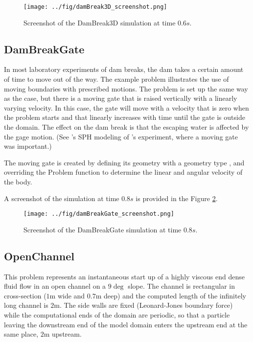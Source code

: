 \documentclass{../GPUSPHtemplate}
\begin{document}
\begin{figure}[h]
  \begin{center}
    \texttt{[image: ../fig/damBreak3D\_screenshot.png]}
    \caption{Screenshot of the DamBreak3D simulation at time $0.6s$.}\label{fig:DamBreak3D}   
  \end{center}
\end{figure}

\subsection{DamBreakGate}

In most laboratory experiments of dam breaks, the dam takes a certain
amount of time to move out of the way. The example problem
 illustrates the use of moving boundaries
with prescribed motions. The problem is set up the same way as the
 case, but there is a moving gate that is raised
vertically with a linearly varying velocity. In this case, the gate will
move with a velocity that is zero when the problem starts and that
linearly increases with time until the gate is outside the domain. The
effect on the dam break is that the escaping water is affected by the
gage motion. (See \cite{crespo_modeling_2008}'s SPH modeling of
\cite{janosi_turbulent_2004}'s experiment, where a moving gate was important.)

The moving gate is created by defining its geometry with a geometry type
, and overriding the Problem
 function to determine the linear and
angular velocity of the body.

A screenshot of the simulation at time $0.8s$ is provided
in the Figure \ref{fig:DamBreakGate}.

\begin{figure}[h]
  \begin{center}
    \texttt{[image: ../fig/damBreakGate\_screenshot.png]}
    \caption{Screenshot of the DamBreakGate simulation at time $0.8s$.}\label{fig:DamBreakGate}   
  \end{center}
\end{figure}

\subsection{OpenChannel}

This problem represents an instantaneous start up of a highly viscous
end dense fluid flow in an open channel on a $9\deg$ slope. The
channel is rectangular in cross-section ($1$m wide and $0.7$m deep) and
the computed length of the infinitely long channel is $2$m. The side
walls are fixed (Leonard-Jones boundary force) while the computational
ends of the domain are periodic, so that a particle leaving the
downstream end of the model domain enters the upstream end at the same
place, $2$m upstream.
\end{document}
